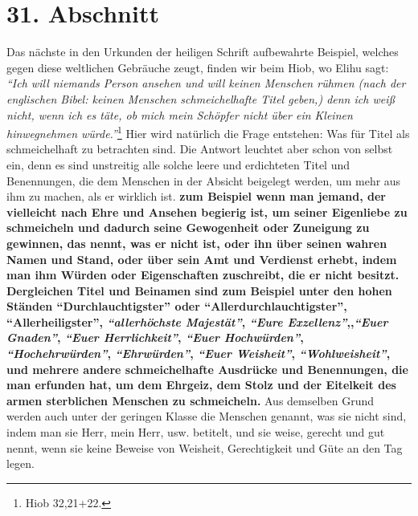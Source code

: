 \section{31. Abschnitt} \label{kap9_ab31}

Das nächste in den Urkunden der heiligen Schrift aufbewahrte Beispiel, welches
gegen diese weltlichen Gebräuche zeugt, finden wir beim Hiob, wo
Elihu sagt:
\textit{"`Ich will niemands Person ansehen und will keinen Menschen rühmen
(nach der
englischen Bibel: keinen Menschen schmeichelhafte Titel geben,) denn ich weiß
nicht, wenn ich es täte, ob mich mein Schöpfer nicht über ein Kleinen
hinwegnehmen würde."'}\footnote{Hiob 32,21+22.}
Hier wird natürlich die Frage
entstehen: Was für Titel als schmeichelhaft zu betrachten sind. Die Antwort
leuchtet aber schon von selbst ein, denn es sind unstreitig alle solche leere
und erdichteten Titel und Benennungen, die dem Menschen in der Absicht beigelegt
werden, um mehr aus ihm zu machen, als er wirklich ist.
\label{ref:09_31_heuchelei} \textbf{zum Beispiel wenn man jemand,
der vielleicht nach Ehre und Ansehen begierig ist, um seiner
Eigenliebe zu
schmeicheln und dadurch seine Gewogenheit oder Zuneigung zu gewinnen, das
nennt, was er nicht ist, oder ihn über seinen wahren Namen und Stand, oder über
sein Amt und Verdienst erhebt, indem man ihm Würden oder Eigenschaften
zuschreibt, die er nicht besitzt. Dergleichen Titel und Beinamen sind zum
Beispiel unter
den hohen Ständen "`Durchlauchtigster"' oder "`Allerdurchlauchtigster"',
"`Allerheiligster"', \textit{"`allerhöchste Majestät"'}, \textit{"`Eure
Exzellenz"'},,\textit{"`Euer
Gnaden"'}, \textit{"`Euer Herrlichkeit"'}, \textit{"`Euer Hochwürden"'},
\textit{"`Hochehrwürden"'},
\textit{"`Ehrwürden"'}, \textit{"`Euer Weisheit"'}, \textit{"`Wohlweisheit"'},
und mehrere andere
schmeichelhafte Ausdrücke und Benennungen, die man erfunden hat, um dem Ehrgeiz,
dem Stolz und der Eitelkeit des armen sterblichen Menschen zu schmeicheln.}
Aus demselben Grund werden auch unter der geringen Klasse die Menschen
genannt, was sie nicht sind, indem man sie Herr, mein Herr, usw. betitelt,
und sie weise, gerecht und gut nennt, wenn sie keine Beweise von Weisheit,
Gerechtigkeit und Güte an den Tag legen.

\medskip

